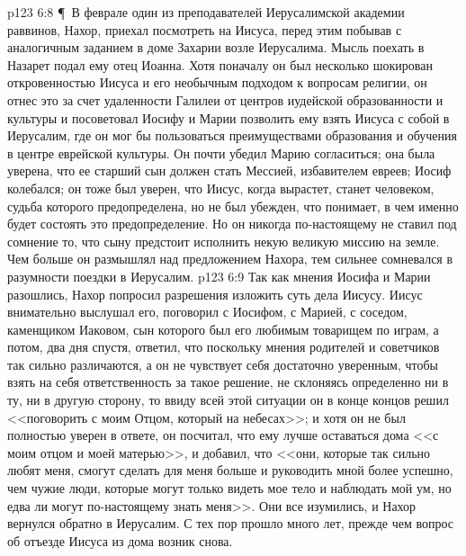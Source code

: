\vs p123 6:8 \P\ В феврале один из преподавателей Иерусалимской академии раввинов, Нахор, приехал посмотреть на Иисуса, перед этим побывав с аналогичным заданием в доме Захарии возле Иерусалима. Мысль поехать в Назарет подал ему отец Иоанна. Хотя поначалу он был несколько шокирован откровенностью Иисуса и его необычным подходом к вопросам религии, он отнес это за счет удаленности Галилеи от центров иудейской образованности и культуры и посоветовал Иосифу и Марии позволить ему взять Иисуса с собой в Иерусалим, где он мог бы пользоваться преимуществами образования и обучения в центре еврейской культуры. Он почти убедил Марию согласиться; она была уверена, что ее старший сын должен стать Мессией, избавителем евреев; Иосиф колебался; он тоже был уверен, что Иисус, когда вырастет, станет человеком, судьба которого предопределена, но не был убежден, что понимает, в чем именно будет состоять это предопределение. Но он никогда по\hyp{}настоящему не ставил под сомнение то, что сыну предстоит исполнить некую великую миссию на земле. Чем больше он размышлял над предложением Нахора, тем сильнее сомневался в разумности поездки в Иерусалим.
\vs p123 6:9 Так как мнения Иосифа и Марии разошлись, Нахор попросил разрешения изложить суть дела Иисусу. Иисус внимательно выслушал его, поговорил с Иосифом, с Марией, с соседом, каменщиком Иаковом, сын которого был его любимым товарищем по играм, а потом, два дня спустя, ответил, что поскольку мнения родителей и советчиков так сильно различаются, а он не чувствует себя достаточно уверенным, чтобы взять на себя ответственность за такое решение, не склоняясь определенно ни в ту, ни в другую сторону, то ввиду всей этой ситуации он в конце концов решил <<поговорить с моим Отцом, который на небесах>>; и хотя он не был полностью уверен в ответе, он посчитал, что ему лучше оставаться дома <<с моим отцом и моей матерью>>, и добавил, что <<они, которые так сильно любят меня, смогут сделать для меня больше и руководить мной более успешно, чем чужие люди, которые могут только видеть мое тело и наблюдать мой ум, но едва ли могут по\hyp{}настоящему знать меня>>. Они все изумились, и Нахор вернулся обратно в Иерусалим. С тех пор прошло много лет, прежде чем вопрос об отъезде Иисуса из дома возник снова.
